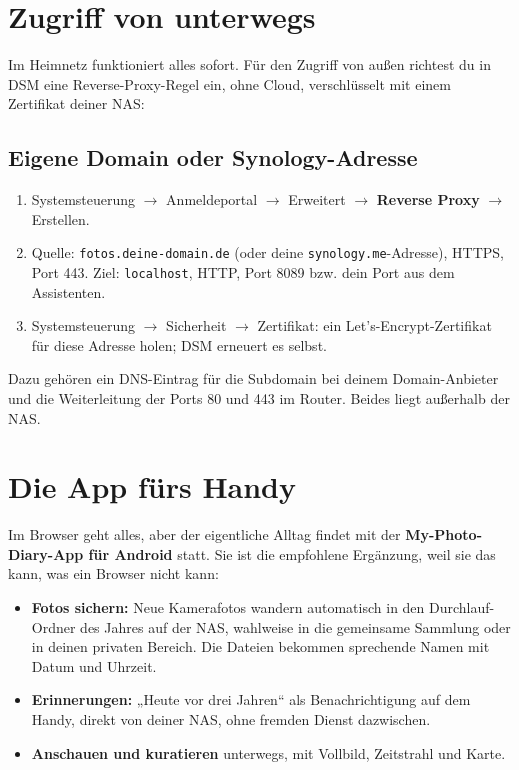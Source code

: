 \documentclass[11pt,a4paper]{article}
\let\mpdtt\texttt
\renewcommand{\texttt}[1]{\mpdtt{\textcolor{mpdred}{#1}}}
\begin{document}
\section{Zugriff von unterwegs}

Im Heimnetz funktioniert alles sofort. Für den Zugriff von außen richtest du in
DSM eine Reverse-Proxy-Regel ein, ohne Cloud, verschlüsselt mit einem Zertifikat
deiner NAS:

\subsection{Eigene Domain oder Synology-Adresse}
\begin{enumerate}[leftmargin=*, itemsep=2pt]
  \item Systemsteuerung \(\rightarrow\) Anmeldeportal \(\rightarrow\)
    Erweitert \(\rightarrow\) \textbf{Reverse Proxy} \(\rightarrow\) Erstellen.
  \item Quelle: \texttt{fotos.deine-domain.de} (oder deine
    \texttt{synology.me}-Adresse), HTTPS, Port 443. Ziel: \texttt{localhost},
    HTTP, Port 8089 bzw. dein Port aus dem Assistenten.
  \item Systemsteuerung \(\rightarrow\) Sicherheit \(\rightarrow\) Zertifikat:
    ein Let's-Encrypt-Zertifikat für diese Adresse holen; DSM erneuert es selbst.
\end{enumerate}
Dazu gehören ein DNS-Eintrag für die Subdomain bei deinem Domain-Anbieter und
die Weiterleitung der Ports 80 und 443 im Router. Beides liegt außerhalb der NAS.

\section{Die App fürs Handy}

Im Browser geht alles, aber der eigentliche Alltag findet mit der
\textbf{My-Photo-Diary-App für Android} statt. Sie ist die empfohlene
Ergänzung, weil sie das kann, was ein Browser nicht kann:
\begin{itemize}
  \item \textbf{Fotos sichern:} Neue Kamerafotos wandern automatisch in den
    Durchlauf-Ordner des Jahres auf der NAS, wahlweise in die gemeinsame
    Sammlung oder in deinen privaten Bereich. Die Dateien bekommen sprechende
    Namen mit Datum und Uhrzeit.
  \item \textbf{Erinnerungen:} „Heute vor drei Jahren“ als Benachrichtigung auf
    dem Handy, direkt von deiner NAS, ohne fremden Dienst dazwischen.
  \item \textbf{Anschauen und kuratieren} unterwegs, mit Vollbild, Zeitstrahl
    und Karte.
\end{itemize}
\end{document}
